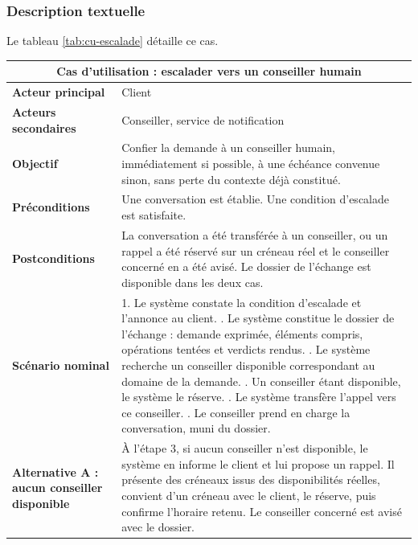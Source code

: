 \subsubsection{Description textuelle}

Le tableau \ref{tab:cu-escalade} détaille ce cas.

\begin{table}[H]
\centering
\renewcommand{\arraystretch}{1.25}
\begin{tabular}{|p{3.0cm}|p{11.5cm}|}
\hline
\multicolumn{2}{|c|}{\textbf{Cas d'utilisation : escalader vers un conseiller humain}} \\
\hline
\textbf{Acteur principal} & Client \\
\hline
\textbf{Acteurs secondaires} & Conseiller, service de notification \\
\hline
\textbf{Objectif} & Confier la demande à un conseiller humain, immédiatement si possible, à une échéance convenue sinon, sans perte du contexte déjà constitué. \\
\hline
\textbf{Préconditions} & Une conversation est établie. Une condition d'escalade est satisfaite. \\
\hline
\textbf{Postconditions} & La conversation a été transférée à un conseiller, ou un rappel a été réservé sur un créneau réel et le conseiller concerné en a été avisé. Le dossier de l'échange est disponible dans les deux cas. \\
\hline
\textbf{Scénario nominal} &
1. Le système constate la condition d'escalade et l'annonce au client. \newline
2. Le système constitue le dossier de l'échange : demande exprimée, éléments compris, opérations tentées et verdicts rendus. \newline
3. Le système recherche un conseiller disponible correspondant au domaine de la demande. \newline
4. Un conseiller étant disponible, le système le réserve. \newline
5. Le système transfère l'appel vers ce conseiller. \newline
6. Le conseiller prend en charge la conversation, muni du dossier. \\
\hline
\textbf{Alternative A : aucun conseiller disponible} & À l'étape 3, si aucun conseiller n'est disponible, le système en informe le client et lui propose un rappel. Il présente des créneaux issus des disponibilités réelles, convient d'un créneau avec le client, le réserve, puis confirme l'horaire retenu. Le conseiller concerné est avisé avec le dossier. \\

\end{tabular}
\end{table}
